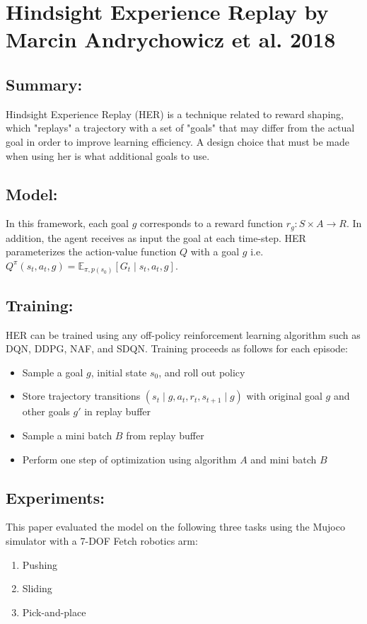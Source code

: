 \section{Hindsight Experience Replay by Marcin Andrychowicz et al. 2018}

\subsection{Summary:}

Hindsight Experience Replay (HER) is a technique related to reward shaping, which
"replays" a trajectory with a set of "goals" that may differ from the actual goal 
in order to improve learning efficiency. A design choice that must be made when using her
is what additional goals to use. 

\subsection{Model:}
In this framework, each goal $g$ corresponds to a reward function $r_g : S \times A \rightarrow R$.
In addition, the agent receives as input the goal at each time-step.
HER parameterizes the action-value function $Q$ with a goal $g$
i.e. $Q^{\pi}(s_t, a_t, g) = \mathbb{E}_{\pi, p(s_0)}[G_t \mid s_t, a_t, g]$.

\subsection{Training:}
HER can be trained using any off-policy reinforcement learning algorithm such as 
DQN, DDPG, NAF, and SDQN. Training proceeds as follows for each episode:
\begin{itemize}
\item Sample a goal $g$, initial state $s_0$, and roll out policy
\item Store trajectory transitions $(s_t \mid g, a_t, r_t, s_{t+1} \mid g)$ with original goal $g$ and other goals $g'$ in replay buffer
\item Sample a mini batch $B$ from replay buffer
\item Perform one step of optimization using algorithm $A$ and mini batch $B$
\end{itemize}

\subsection{Experiments:}
This paper evaluated the model on the following three tasks using the Mujoco simulator 
with a 7-DOF Fetch robotics arm:
\begin{enumerate}
\item Pushing
\item Sliding
\item Pick-and-place
\end{enumerate}

